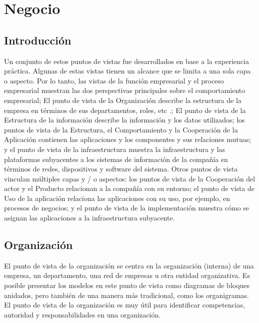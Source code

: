 \chapter{Negocio}

\section{Introducción}
Un conjunto de estos puntos de vistas fue desarrollados en base a la experiencia práctica. Algunas de estas vistas tienen un alcance que se limita a una sola capa o aspecto. Por lo tanto, las vistas de la función empresarial y el proceso empresarial muestran las dos perspectivas principales sobre el comportamiento empresarial; El punto de vista de la Organización describe la estructura de la empresa en términos de sus departamentos, roles, etc .; El punto de vista de la Estructura de la información describe la información y los datos utilizados; los puntos de vista de la Estructura, el Comportamiento y la Cooperación de la Aplicación contienen las aplicaciones y los componentes y sus relaciones mutuas; y el punto de vista de la infraestructura muestra la infraestructura y las plataformas subyacentes a los sistemas de información de la compañía en términos de redes, dispositivos y software del sistema. Otros puntos de vista vinculan múltiples capas y / o aspectos: los puntos de vista de la Cooperación del actor y el Producto relacionan a la compañía con su entorno; el punto de vista de Uso de la aplicación relaciona las aplicaciones con su uso, por ejemplo, en procesos de negocios; y el punto de vista de la implementación muestra cómo se asignan las aplicaciones a la infraestructura subyacente. 
\newpage

\section{Organización}
El punto de vista de la organización se centra en la organización (interna) de una empresa, un departamento, una red de empresas u otra entidad organizativa. Es posible presentar los modelos en este punto de vista como diagramas de bloques anidados, pero también de una manera más tradicional, como los organigramas. El punto de vista de la organización es muy útil para identificar competencias, autoridad y responsabilidades en una organización.
